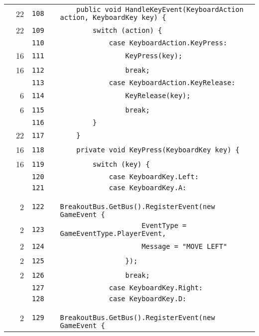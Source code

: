 \documentclass[a4paper,landscape,10pt]{article}
\begin{document}
\begin{longtable}[l]{lrrll}
\cellcolor{green} & 22 & \verb~108~ & & \verb~    public void HandleKeyEvent(KeyboardAction action, KeyboardKey key) {~\\
\cellcolor{green} & 22 & \verb~109~ & & \verb~        switch (action) {~\\
\cellcolor{gray} &  & \verb~110~ & & \verb~            case KeyboardAction.KeyPress:~\\
\cellcolor{green} & 16 & \verb~111~ & & \verb~                KeyPress(key);~\\
\cellcolor{green} & 16 & \verb~112~ & & \verb~                break;~\\
\cellcolor{gray} &  & \verb~113~ & & \verb~            case KeyboardAction.KeyRelease:~\\
\cellcolor{green} & 6 & \verb~114~ & & \verb~                KeyRelease(key);~\\
\cellcolor{green} & 6 & \verb~115~ & & \verb~                break;~\\
\cellcolor{gray} &  & \verb~116~ & & \verb~        }~\\
\cellcolor{green} & 22 & \verb~117~ & & \verb~    }~\\
\cellcolor{green} & 16 & \verb~118~ & & \verb~    private void KeyPress(KeyboardKey key) {~\\
\cellcolor{green} & 16 & \verb~119~ & & \verb~        switch (key) {~\\
\cellcolor{gray} &  & \verb~120~ & & \verb~            case KeyboardKey.Left:~\\
\cellcolor{gray} &  & \verb~121~ & & \verb~            case KeyboardKey.A:~\\
\cellcolor{green} & 2 & \verb~122~ & & \verb~                BreakoutBus.GetBus().RegisterEvent(new GameEvent {~\\
\cellcolor{green} & 2 & \verb~123~ & & \verb~                    EventType = GameEventType.PlayerEvent,~\\
\cellcolor{green} & 2 & \verb~124~ & & \verb~                    Message = "MOVE LEFT"~\\
\cellcolor{green} & 2 & \verb~125~ & & \verb~                });~\\
\cellcolor{green} & 2 & \verb~126~ & & \verb~                break;~\\
\cellcolor{gray} &  & \verb~127~ & & \verb~            case KeyboardKey.Right:~\\
\cellcolor{gray} &  & \verb~128~ & & \verb~            case KeyboardKey.D:~\\
\cellcolor{green} & 2 & \verb~129~ & & \verb~                BreakoutBus.GetBus().RegisterEvent(new GameEvent {~\\

\end{longtable}
\end{document}
